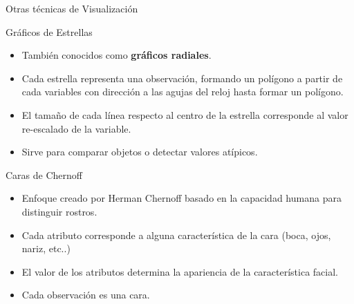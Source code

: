 \documentclass[handout]{beamer}
\begin{document}
\begin{frame}[fragile]{Otras técnicas de Visualización}
\scriptsize{
\begin{block}{Gráficos de Estrellas}
\begin{itemize}
  \item También conocidos como \textbf{gráficos radiales}.
  \item Cada estrella representa una observación, formando un polígono a partir de cada variables con dirección a las agujas del reloj hasta formar un polígono.
  \item El tamaño de cada línea respecto al centro de la estrella corresponde al valor re-escalado de la variable.
  \item Sirve para comparar objetos o detectar valores atípicos.
  \end{itemize} 
  
\end{block}

\begin{block}{Caras de Chernoff}
\begin{itemize}
 \item Enfoque creado por Herman Chernoff basado en la capacidad humana para distinguir rostros. 
 \item Cada atributo corresponde a alguna característica de la cara (boca, ojos, nariz, etc..)
 \item El valor de los atributos determina la apariencia de la característica facial.
 \item Cada observación es una cara.
\end{itemize}
 
 
\end{block}


 
 }  
\end{frame}
\end{document}
